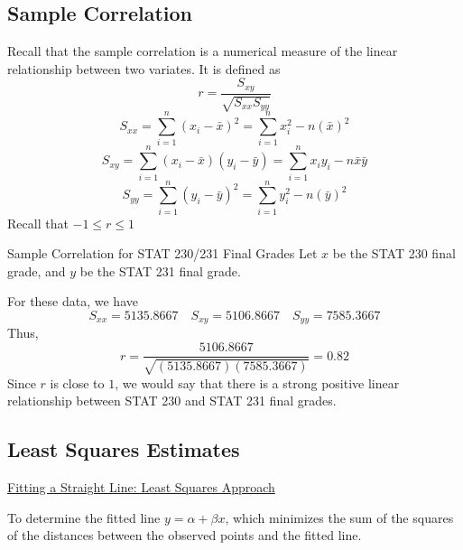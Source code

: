 \subsection{Sample Correlation}
Recall that the sample correlation is a numerical measure of the linear relationship between two variates.
It is defined as
\[r=\frac{S_{x y}}{\sqrt{S_{x x} S_{y y}}}\]
\[S_{x x}=\sum_{i=1}^{n}\left(x_{i}-\bar{x}\right)^{2}=\sum_{i=1}^{n} x_{i}^{2}-n(\bar{x})^{2}\]
\[S_{x y}=\sum_{i=1}^{n}\left(x_{i}-\bar{x}\right)\left(y_{i}-\bar{y}\right)=\sum_{i=1}^{n} x_{i} y_{i}-n \bar{x} \bar{y}\]
\[S_{y y}=\sum_{i=1}^{n}\left(y_{i}-\bar{y}\right)^{2}=\sum_{i=1}^{n} y_{i}^{2}-n(\bar{y})^{2}\]
Recall that $ -1\leqslant r\leqslant 1 $

\begin{Example}{Sample Correlation for STAT 230/231 Final Grades}{}
    Let $ x $ be the STAT 230 final grade, and $ y $ be the STAT 231 final grade.

    For these data, we have
    \[S_{x x}=5135.8667 \quad S_{x y}=5106.8667 \quad S_{y y}=7585.3667\]
    Thus,
    \[r=\frac{5106.8667}{\sqrt{(5135.8667)(7585.3667)}}=0.82\]
    Since $ r $ is close to $ 1 $, we would say that there is a strong positive linear
    relationship between STAT 230 and STAT 231 final grades.
\end{Example}


\subsection{Least Squares Estimates}
\underline{Fitting a Straight Line: Least Squares Approach}

To determine the fitted line $ y=\alpha+\beta x $, which minimizes the sum of the squares
of the distances between the observed points and the fitted line.

